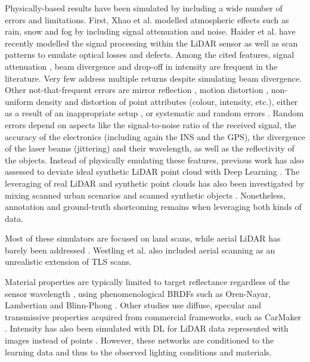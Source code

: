Physically-based results have been simulated by including a wide number of errors and limitations. First, Xhao et al. \cite{zhao_method_2021} modelled atmospheric effects such as rain, snow and fog by including signal attenuation and noise. Haider et al. \cite{haider_development_2022} have recently modelled the signal processing within the LiDAR sensor as well as scan patterns to emulate optical losses and defects. Among the cited features, signal attenuation \cite{dosovitskiy_carla_2017, bechtold_helios_2016, hanke_generation_2017}, beam divergence \cite{zhao_method_2021, bechtold_helios_2016, hanke_generation_2017, haider_development_2022} and drop-off in intensity \cite{ahn_real-time_2020} are frequent in the literature. Very few address multiple returns \cite{winiwarter_virtual_2022} despite simulating beam divergence. Other not-that-frequent errors are mirror reflection \cite{ullrich_advances_2019}, motion distortion \cite{chen_analysis_2022}, non-uniform density and distortion of point attributes (colour, intensity, etc.), either as a result of an inappropriate setup \cite{dimitrov_segmentation_2015}, or systematic and random errors \cite{isheil_systematic_2011, fan_error_2015, pandzic_error_2017}. Random errors depend on aspects like the signal-to-noise ratio of the received signal, the accuracy of the electronics (including again the INS and the GPS), the divergence of the laser beams (jittering) and their wavelength, as well as the reflectivity of the objects. Instead of physically emulating these features, previous work has also assessed to deviate ideal synthetic LiDAR point cloud with Deep Learning \cite{manivasagam_lidarsim_2020, xiao_synlidar_2021, guillard_learning_2022}. The leveraging of real LiDAR and synthetic point clouds has also been investigated by mixing scanned urban scenarios and scanned synthetic objects \cite{manivasagam_lidarsim_2020}. Nonetheless, annotation and ground-truth shortcoming remains when leveraging both kinds of data.

Most of these simulators are focused on land scans, while aerial LiDAR has barely been addressed  \cite{winiwarter_virtual_2022}. Westling et al. \cite{westling_simtreels_2020} also included aerial scanning as an unrealistic extension of TLS scans.

Material properties are typically limited to target reflectance regardless of the sensor wavelength \cite{chen_analysis_2022, gschwandtner_blensor_2011, zohdi_rapid_2020}, using phenomenological BRDFs such as Oren-Nayar, Lambertian and Blinn-Phong \cite{chen_analysis_2022}. Other studies use diffuse, specular and transmissive properties acquired from commercial frameworks, such as CarMaker \cite{haider_development_2022}. Intensity has also been simulated with DL for LiDAR data represented with images instead of points \cite{vacek_learning_2022, xiao_synlidar_2021}. However, these networks are conditioned to the learning data and thus to the observed lighting conditions and materials. 

